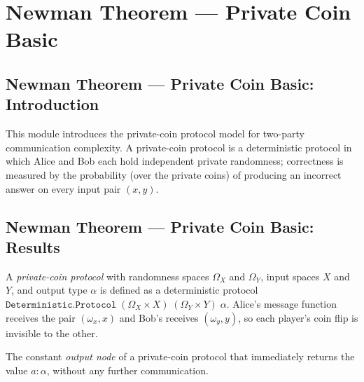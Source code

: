 \section{Newman Theorem --- Private Coin Basic}
\subsection*{Newman Theorem --- Private Coin Basic: Introduction}

This module introduces the private-coin protocol model for two-party communication
complexity. A private-coin protocol is a deterministic protocol in which Alice and Bob
each hold independent private randomness; correctness is measured by the probability
(over the private coins) of producing an incorrect answer on every input pair $(x, y)$.

\subsection*{Newman Theorem --- Private Coin Basic: Results}

\begin{definition}
\label{CommunicationComplexity.PrivateCoin.Protocol}
\leanok
{}
A \emph{private-coin protocol} with randomness spaces $\Omega_X$ and $\Omega_Y$, input
spaces $X$ and $Y$, and output type $\alpha$ is defined as a deterministic protocol
$\texttt{Deterministic.Protocol}\;(\Omega_X \times X)\;(\Omega_Y \times Y)\;\alpha$.
Alice's message function receives the pair $(\omega_x, x)$ and Bob's receives
$(\omega_y, y)$, so each player's coin flip is invisible to the other.
\end{definition}

\begin{definition}
\label{CommunicationComplexity.PrivateCoin.Protocol.output}
\leanok
{}
The constant \emph{output node} of a private-coin protocol that immediately returns the
value $a : \alpha$, without any further communication.
\end{definition}


